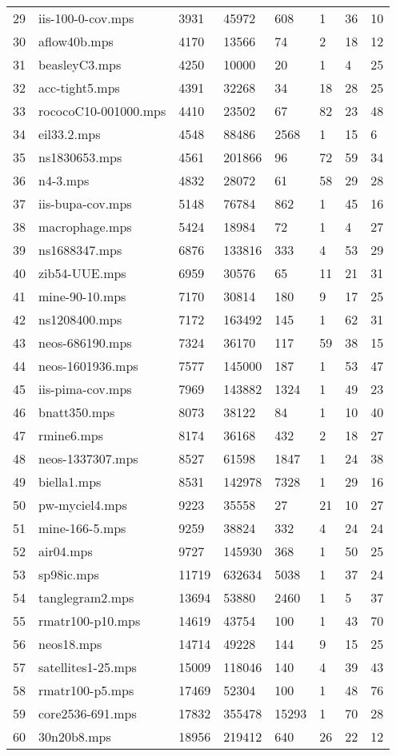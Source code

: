 \documentclass{article}
\begin{document}
\begin{longtable}{|l |l |l |l |l |l |l |l |}
29&iis-100-0-cov.mps&3931&45972&608&1&36&10\\
30&aflow40b.mps&4170&13566&74&2&18&12\\
31&beasleyC3.mps&4250&10000&20&1&4&25\\
32&acc-tight5.mps&4391&32268&34&18&28&25\\
33&rococoC10-001000.mps&4410&23502&67&82&23&48\\
34&eil33.2.mps&4548&88486&2568&1&15&6\\
35&ns1830653.mps&4561&201866&96&72&59&34\\
36&n4-3.mps&4832&28072&61&58&29&28\\
37&iis-bupa-cov.mps&5148&76784&862&1&45&16\\
38&macrophage.mps&5424&18984&72&1&4&27\\
39&ns1688347.mps&6876&133816&333&4&53&29\\
40&zib54-UUE.mps&6959&30576&65&11&21&31\\
41&mine-90-10.mps&7170&30814&180&9&17&25\\
42&ns1208400.mps&7172&163492&145&1&62&31\\
43&neos-686190.mps&7324&36170&117&59&38&15\\
44&neos-1601936.mps&7577&145000&187&1&53&47\\
45&iis-pima-cov.mps&7969&143882&1324&1&49&23\\
46&bnatt350.mps&8073&38122&84&1&10&40\\
47&rmine6.mps&8174&36168&432&2&18&27\\
48&neos-1337307.mps&8527&61598&1847&1&24&38\\
49&biella1.mps&8531&142978&7328&1&29&16\\
50&pw-myciel4.mps&9223&35558&27&21&10&27\\
51&mine-166-5.mps&9259&38824&332&4&24&24\\
52&air04.mps&9727&145930&368&1&50&25\\
53&sp98ic.mps&11719&632634&5038&1&37&24\\
54&tanglegram2.mps&13694&53880&2460&1&5&37\\
55&rmatr100-p10.mps&14619&43754&100&1&43&70\\
56&neos18.mps&14714&49228&144&9&15&25\\
57&satellites1-25.mps&15009&118046&140&4&39&43\\
58&rmatr100-p5.mps&17469&52304&100&1&48&76\\
59&core2536-691.mps&17832&355478&15293&1&70&28\\
60&30n20b8.mps&18956&219412&640&26&22&12\\

\end{longtable}
\end{document}
